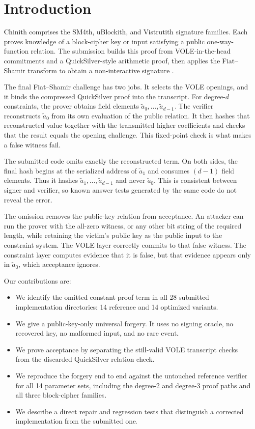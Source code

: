 \documentclass[11pt,a4paper]{article}
\begin{document}
\section{Introduction}

Chinith comprises the SM4th, uBlockith, and Vistrutith signature families.
Each proves knowledge of a block-cipher key or input satisfying a public
one-way-function relation.  The submission builds this proof from
VOLE-in-the-head commitments and a QuickSilver-style arithmetic proof, then
applies the Fiat--Shamir transform to obtain a non-interactive signature
\cite{Chinith,VOLEitH,QuickSilver,FiatShamir}.

The final Fiat--Shamir challenge has two jobs.  It selects the VOLE openings,
and it binds the compressed QuickSilver proof into the transcript.  For
degree-$d$ constraints, the prover obtains field elements
$\widetilde a_0,\ldots,\widetilde a_{d-1}$.  The verifier reconstructs
$\widetilde a_0$ from its own evaluation of the public relation.  It then
hashes that reconstructed value together with the transmitted higher
coefficients and checks that the result equals the opening challenge.  This
fixed-point check is what makes a false witness fail.

The submitted code omits exactly the reconstructed term.  On both sides, the
final hash begins at the serialized address of $\widetilde a_1$ and consumes
$(d-1)$ field elements.  Thus it hashes
$\widetilde a_1,\ldots,\widetilde a_{d-1}$ and never
$\widetilde a_0$.  This is consistent between signer and verifier, so known
answer tests generated by the same code do not reveal the error.

The omission removes the public-key relation from acceptance.  An attacker can
run the prover with the all-zero witness, or any other bit string of the
required length, while retaining the victim's public key as the public input
to the constraint system.  The VOLE layer correctly commits to that false
witness.  The constraint layer computes evidence that it is false, but that
evidence appears only in $\widetilde a_0$, which acceptance ignores.

Our contributions are:

\begin{itemize}[leftmargin=1.5em]
  \item We identify the omitted constant proof term in all 28 submitted
        implementation directories: 14 reference and 14 optimized variants.
  \item We give a public-key-only universal forgery.  It uses no signing
        oracle, no recovered key, no malformed input, and no rare event.
  \item We prove acceptance by separating the still-valid VOLE transcript
        checks from the discarded QuickSilver relation check.
  \item We reproduce the forgery end to end against the untouched reference
        verifier for all 14 parameter sets, including the degree-2 and
        degree-3 proof paths and all three block-cipher families.
  \item We describe a direct repair and regression tests that distinguish a
        corrected implementation from the submitted one.
\end{itemize}
\end{document}
